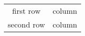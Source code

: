 \documentclass{article}
\begin{document}
\begin{tabular}{| c | >{\centering\arraybackslash}p{1cm}}
first row & column \\
second row & column
\end{tabular}
\end{document}
